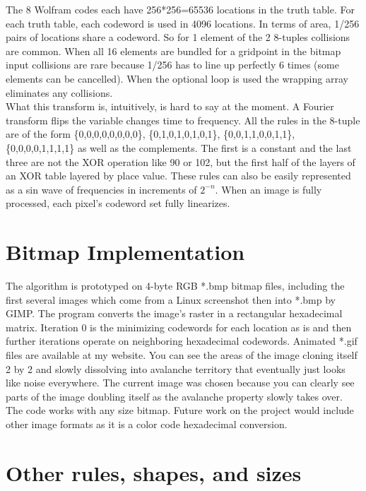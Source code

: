 \documentclass[11pt]{article}
\begin{document}
The 8 Wolfram codes each have 256*256=65536 locations in the truth table. For each truth table, each codeword is used in 4096 locations. In terms of area, 1/256 pairs of locations share a codeword. So for 1 element of the 2 8-tuples collisions are common. When all 16 elements are bundled for a gridpoint in the bitmap input collisions are rare because 1/256 has to line up perfectly 6 times (some elements can be cancelled). When the optional loop is used the wrapping array eliminates any collisions.\\

What this transform is, intuitively, is hard to say at the moment. A Fourier transform flips the variable changes time to frequency. All the rules in the 8-tuple are of the form \{0,0,0,0,0,0,0,0\}, \{0,1,0,1,0,1,0,1\}, \{0,0,1,1,0,0,1,1\}, \{0,0,0,0,1,1,1,1\} as well as the complements. The first is a constant and the last three are not the XOR operation like 90 or 102, but the first half of the layers of an XOR table layered by place value. These rules can also be easily represented as a sin wave of frequencies in increments of $2^{-n}$. When an image is fully processed, each pixel's codeword set fully linearizes. 

\section{Bitmap Implementation}

The algorithm is prototyped on 4-byte RGB *.bmp bitmap files, including the first several images which come from a Linux screenshot then into *.bmp by GIMP. The program converts the image's raster in a rectangular hexadecimal matrix. Iteration 0 is the minimizing codewords for each location as is and then further iterations operate on neighboring hexadecimal codewords. Animated *.gif files are available at my website. You can see the areas of the image cloning itself 2 by 2 and slowly dissolving into avalanche territory that eventually just looks like noise everywhere. The current image was chosen because you can clearly see parts of the image doubling itself as the avalanche property slowly takes over. The code works with any size bitmap. Future work on the project would include other image formats as it is a color code hexadecimal conversion. 

\section{Other rules, shapes, and sizes}
\end{document}
